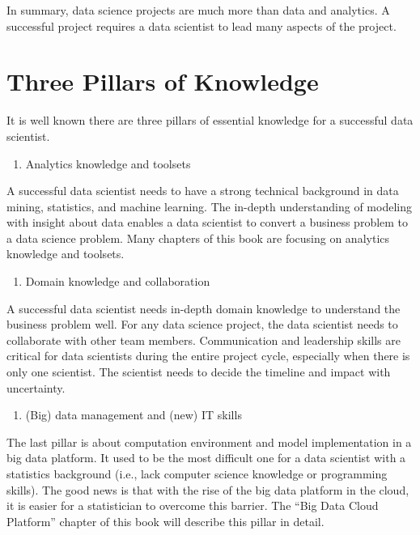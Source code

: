 \documentclass[
  12pt,
]{krantz}
\providecommand{\tightlist}{%
  \setlength{\itemsep}{0pt}\setlength{\parskip}{0pt}}
\begin{document}
In summary, data science projects are much more than data and analytics. A successful project requires a data scientist to lead many aspects of the project.

\hypertarget{three-pillars-of-knowledge}{%
\section{Three Pillars of Knowledge}\label{three-pillars-of-knowledge}}

It is well known there are three pillars of essential knowledge for a successful data scientist.

\begin{enumerate}
\def\labelenumi{(\arabic{enumi})}
\tightlist
\item
  Analytics knowledge and toolsets
\end{enumerate}

A successful data scientist needs to have a strong technical background in data mining, statistics, and machine learning. The in-depth understanding of modeling with insight about data enables a data scientist to convert a business problem to a data science problem. Many chapters of this book are focusing on analytics knowledge and toolsets.

\begin{enumerate}
\def\labelenumi{(\arabic{enumi})}
\setcounter{enumi}{1}
\tightlist
\item
  Domain knowledge and collaboration
\end{enumerate}

A successful data scientist needs in-depth domain knowledge to understand the business problem well. For any data science project, the data scientist needs to collaborate with other team members. Communication and leadership skills are critical for data scientists during the entire project cycle, especially when there is only one scientist. The scientist needs to decide the timeline and impact with uncertainty.

\begin{enumerate}
\def\labelenumi{(\arabic{enumi})}
\setcounter{enumi}{2}
\tightlist
\item
  (Big) data management and (new) IT skills
\end{enumerate}

The last pillar is about computation environment and model implementation in a big data platform. It used to be the most difficult one for a data scientist with a statistics background (i.e., lack computer science knowledge or programming skills). The good news is that with the rise of the big data platform in the cloud, it is easier for a statistician to overcome this barrier. The ``Big Data Cloud Platform'' chapter of this book will describe this pillar in detail.
\end{document}
